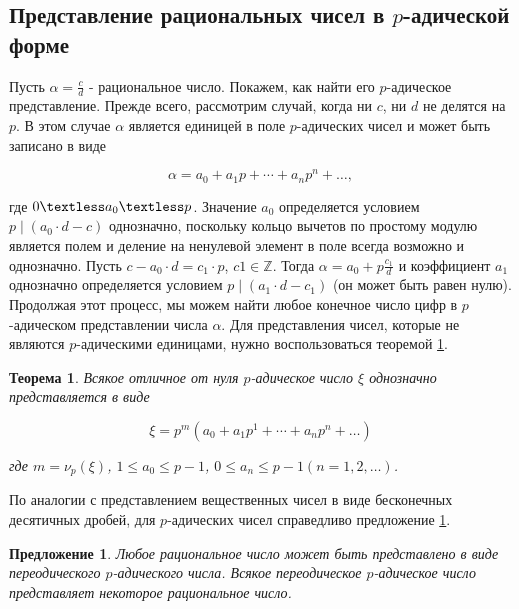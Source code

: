 \documentclass[master, och, diploma, times]{sty/SCWorks}
\theoremstyle{plain}
\newtheorem{thethm}{Теорема}[section]
\newtheorem{proposition}{Предложение}[section]
\theoremstyle{definition}
\begin{document}
\subsection{Представление рациональных чисел в $p$-адической форме}
Пусть $\alpha=\frac{c}{d}$ - рациональное число. Покажем, как найти его $p$-адическое представление. Прежде всего, рассмотрим случай, когда ни $c$, ни $d$ не делятся на $p$. В этом случае $\alpha$ является единицей в поле $p$-адических чисел и может быть записано в виде 

\begin{equation}
\alpha=a_0+a_1p+\cdots+a_np^n+\dots,	
\end{equation}

\noindent где $0 \textless a_0 \textless p$. Значение $a_0$ определяется условием $p \mid (a_0 \cdot d-c)$ однозначно, поскольку кольцо вычетов по простому модулю является полем и деление на ненулевой элемент в поле всегда возможно и однозначно. Пусть $c-a_0 \cdot d=c_1 \cdot p$, $c1 \in \mathbb{Z}$. Тогда $\alpha=a_0+p\frac{c_1}{d}$ и коэффициент $a_1$ однозначно определяется условием $p \mid (a_1 \cdot d-c_1)$ (он может быть равен нулю). Продолжая этот процесс, мы можем найти любое конечное число цифр в $p$-адическом представлении числа $\alpha$. Для представления чисел, которые не являются $p$-адическими единицами, нужно воспользоваться теоремой \ref{th:numbers:representation}.

\begin{thethm}\label{th:numbers:representation}
Всякое отличное от нуля $p$-адическое число $\xi$ однозначно представляется в виде

\begin{equation}
\xi=p^m(a_0+a_1p^1+\cdots+a_np^n+\dots)
\end{equation}

\noindent где $m=\nu_p(\xi)$, $1 \le a_0 \le p-1$, $0 \le a_n \le p-1$$(n=1,2,\dots)$.
\end{thethm}

По аналогии с представлением вещественных чисел в виде бесконечных десятичных дробей, для $p$-адических чисел справедливо предложение \ref{pros:numbers:1}.

\begin{proposition}\label{pros:numbers:1}
Любое рациональное число может быть представлено в виде переодического $p$-адического числа. Всякое переодическое $p$-адическое число представляет некоторое рациональное число.
\end{proposition}
\end{document}
